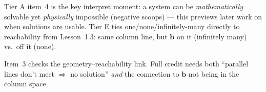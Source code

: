 \documentclass[10pt]{article}
\newcommand{\bb}{\mathbf{b}}
\begin{document}
\begin{teachernote}
Tier A item~4 is the key interpret moment: a system can be \emph{mathematically} solvable yet
\emph{physically} impossible (negative scoops) --- this previews later work on when solutions are
usable. Tier E ties one/none/infinitely-many directly to reachability from Lesson~1.3: same
column line, but $\bb$ on it (infinitely many) vs.\ off it (none).
\end{teachernote}

\begin{teachernote}
Item~3 checks the geometry--reachability link. Full credit needs both ``parallel lines don't
meet $\Rightarrow$ no solution'' \emph{and} the connection to $\bb$ not being in the column space.
\end{teachernote}
\end{document}
